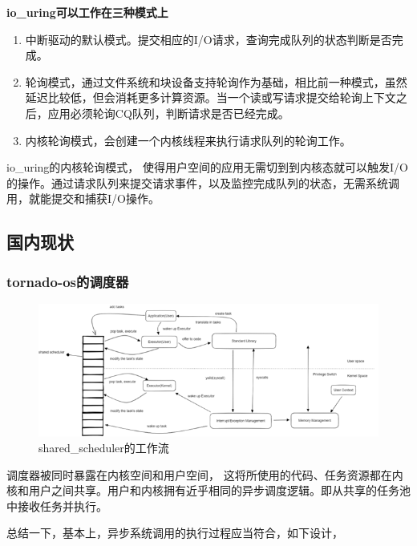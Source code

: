 \textbf{io\_uring可以工作在三种模式上}

\begin{enumerate}
\item 中断驱动的默认模式。提交相应的I/O请求，查询完成队列的状态判断是否完成。
\item 轮询模式，通过文件系统和块设备支持轮询作为基础，相比前一种模式，虽然延迟比较低，但会消耗更多计算资源。当一个读或写请求提交给轮询上下文之后，应用必须轮询CQ队列，判断请求是否已经完成。
\item 内核轮询模式，会创建一个内核线程来执行请求队列的轮询工作。
\end{enumerate}

io\_uring的内核轮询模式， 使得用户空间的应用无需切到到内核态就可以触发I/O的操作。通过请求队列来提交请求事件，以及监控完成队列的状态，无需系统调用，就能提交和捕获I/O操作。


\subsection{国内现状}

\subsubsection{tornado-os的调度器}

\begin{figure}[htb]
    \figureCapSet
    \centering
    \includegraphics[width=.8\linewidth]{figure/c1/sharedscheduler.png}
    \caption{shared\_scheduler的工作流}
    \label{figure:c1sharedscheduler}
\end{figure}

调度器被同时暴露在内核空间和用户空间， 这将所使用的代码、任务资源都在内核和用户之间共享。用户和内核拥有近乎相同的异步调度逻辑。即从共享的任务池中接收任务并执行。

总结一下，基本上，异步系统调用的执行过程应当符合，如下设计，


